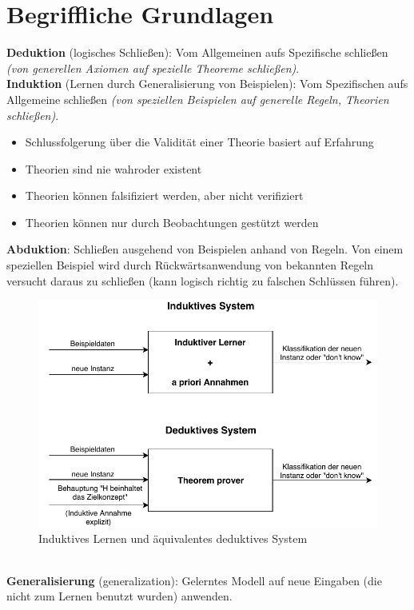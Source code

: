 \section{Begriffliche Grundlagen}

\textbf{Deduktion} (logisches Schließen): Vom Allgemeinen aufs Spezifische schließen \textit{(von generellen Axiomen auf spezielle Theoreme schließen)}.\\[5pt]
\textbf{Induktion} (Lernen durch Generalisierung von Beispielen): Vom Spezifischen aufs Allgemeine schließen \textit{(von speziellen Beispielen auf generelle Regeln, Theorien schließen)}.\vspace*{-5pt}
\begin{itemize}[$\hookrightarrow$]
	\item Schlussfolgerung über die Validität einer Theorie basiert auf Erfahrung
	\item Theorien sind nie \dq wahr\dq oder \dq existent\dq
	\item Theorien können falsifiziert werden, aber nicht verifiziert
	\item Theorien können nur durch Beobachtungen gestützt werden
\end{itemize}
\textbf{Abduktion}: Schließen ausgehend von Beispielen anhand von Regeln. Von einem speziellen Beispiel wird durch Rückwärtsanwendung von bekannten Regeln versucht daraus zu schließen (kann logisch richtig zu falschen Schlüssen führen).
\begin{figure}[ht]
	\centering
	\includegraphics[width=.85\textwidth]{img/inductiveSystem}
	\caption{Induktives Lernen und äquivalentes deduktives System}
	\label{deployment}
\end{figure}\\
\textbf{Generalisierung} (generalization): Gelerntes Modell auf neue Eingaben (die nicht zum Lernen benutzt wurden) anwenden.\\[5pt]
